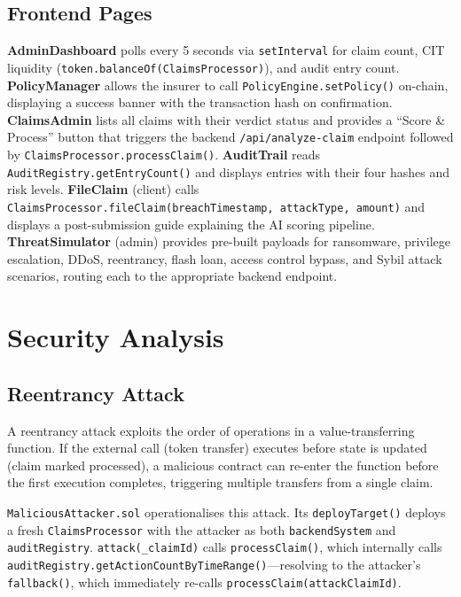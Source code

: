 \documentclass[12pt,a4paper]{article}
\begin{document}
\subsection{Frontend Pages}
\label{sec:pages}

\textbf{AdminDashboard} polls every 5 seconds via \texttt{setInterval}
for claim count, CIT liquidity (\texttt{token.balanceOf(ClaimsProcessor)}),
and audit entry count. \textbf{PolicyManager} allows the insurer to call
\texttt{PolicyEngine.setPolicy()} on-chain, displaying a success banner
with the transaction hash on confirmation. \textbf{ClaimsAdmin} lists
all claims with their verdict status and provides a ``Score \& Process''
button that triggers the backend \texttt{/api/analyze-claim} endpoint
followed by \texttt{ClaimsProcessor.processClaim()}. \textbf{AuditTrail}
reads \texttt{AuditRegistry.getEntryCount()} and displays entries with
their four hashes and risk levels. \textbf{FileClaim} (client) calls
\texttt{ClaimsProcessor.fileClaim(breachTimestamp, attackType, amount)}
and displays a post-submission guide explaining the AI scoring pipeline.
\textbf{ThreatSimulator} (admin) provides pre-built payloads for
ransomware, privilege escalation, DDoS, reentrancy, flash loan, access
control bypass, and Sybil attack scenarios, routing each to the
appropriate backend endpoint.


\section{Security Analysis}
\label{sec:security}

\subsection{Reentrancy Attack}
\label{sec:reentrancy}

A reentrancy attack exploits the order of operations in a value-transferring
function. If the external call (token transfer) executes before state is
updated (claim marked processed), a malicious contract can re-enter the
function before the first execution completes, triggering multiple
transfers from a single claim.

\texttt{MaliciousAttacker.sol} operationalises this attack. Its
\texttt{deployTarget()} deploys a fresh \texttt{ClaimsProcessor} with
the attacker as both \texttt{backendSystem} and \texttt{auditRegistry}.
\texttt{attack(\_claimId)} calls \texttt{processClaim()}, which internally
calls \texttt{auditRegistry.getActionCountByTimeRange()}---resolving to the
attacker's \texttt{fallback()}, which immediately re-calls
\texttt{processClaim(attackClaimId)}.
\end{document}
